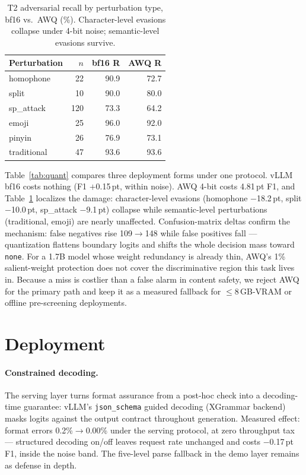 \documentclass[11pt]{article}
\begin{document}
\begin{table}[t]
\centering\small
\setlength{\tabcolsep}{5pt}
\begin{tabular}{lrrr}
\toprule
Perturbation & $n$ & bf16 R & AWQ R \\
\midrule
homophone & 22 & 90.9 & 72.7 \\
split & 10 & 90.0 & 80.0 \\
sp\_attack & 120 & 73.3 & 64.2 \\
emoji & 25 & 96.0 & 92.0 \\
pinyin & 26 & 76.9 & 73.1 \\
traditional & 47 & 93.6 & 93.6 \\
\bottomrule
\end{tabular}
\caption{T2 adversarial recall by perturbation type, bf16 vs.\ AWQ (\%). Character-level evasions collapse under 4-bit noise; semantic-level evasions survive.}
\label{tab:perturb}
\end{table}

Table~\ref{tab:quant} compares three deployment forms under one protocol. vLLM bf16 costs nothing (F1 $+$0.15\,pt, within noise). AWQ 4-bit costs 4.81\,pt F1, and Table~\ref{tab:perturb} localizes the damage: character-level evasions (homophone $-$18.2\,pt, split $-$10.0\,pt, sp\_attack $-$9.1\,pt) collapse while semantic-level perturbations (traditional, emoji) are nearly unaffected. Confusion-matrix deltas confirm the mechanism: false negatives rise 109$\rightarrow$148 while false positives fall --- quantization flattens boundary logits and shifts the whole decision mass toward \texttt{none}. For a 1.7B model whose weight redundancy is already thin, AWQ's 1\% salient-weight protection does not cover the discriminative region this task lives in. Because a miss is costlier than a false alarm in content safety, we reject AWQ for the primary path and keep it as a measured fallback for $\le$8\,GB-VRAM or offline pre-screening deployments.

\section{Deployment}

\paragraph{Constrained decoding.}
The serving layer turns format assurance from a post-hoc check into a decoding-time guarantee: vLLM's \texttt{json\_schema} guided decoding (XGrammar backend) masks logits against the output contract throughout generation. Measured effect: format errors 0.2\%$\rightarrow$0.00\% under the serving protocol, at zero throughput tax --- structured decoding on/off leaves request rate unchanged and costs $-$0.17\,pt F1, inside the noise band. The five-level parse fallback in the demo layer remains as defense in depth.
\end{document}
